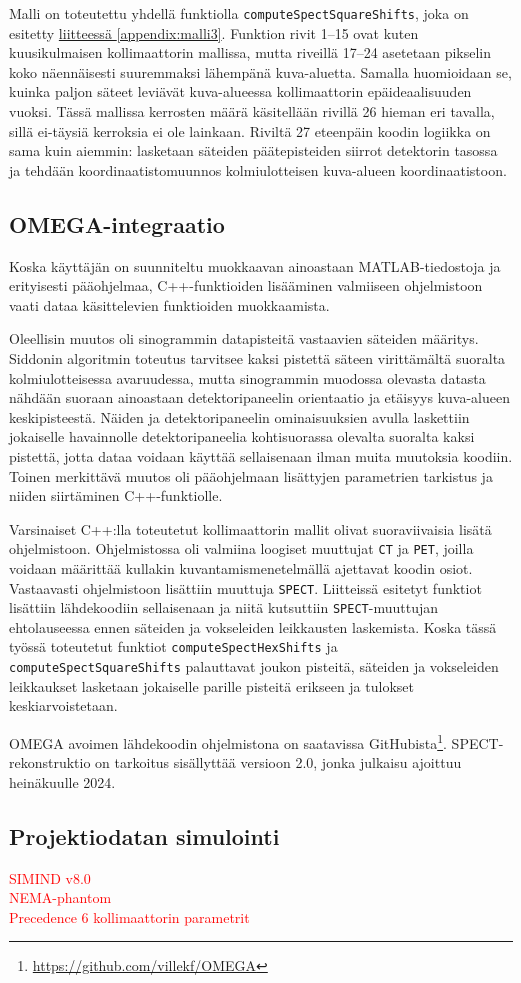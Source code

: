 Malli on toteutettu yhdellä funktiolla \texttt{computeSpectSquareShifts}, joka on esitetty \hyperref[appendix:malli3]{liitteessä \ref*{appendix:malli3}}. Funktion rivit 1--15 ovat kuten kuusikulmaisen kollimaattorin mallissa, mutta riveillä 17--24 asetetaan pikselin koko näennäisesti suuremmaksi lähempänä kuva-aluetta. Samalla huomioidaan se, kuinka paljon säteet leviävät kuva-alueessa kollimaattorin epäideaalisuuden vuoksi. Tässä mallissa kerrosten määrä käsitellään rivillä 26 hieman eri tavalla, sillä ei-täysiä kerroksia ei ole lainkaan. Riviltä 27 eteenpäin koodin logiikka on sama kuin aiemmin: lasketaan säteiden päätepisteiden siirrot detektorin tasossa ja tehdään koordinaatistomuunnos kolmiulotteisen kuva-alueen koordinaatistoon.

\subsection{OMEGA-integraatio}
Koska käyttäjän on suunniteltu muokkaavan ainoastaan MATLAB-tiedostoja ja erityisesti pääohjelmaa, C++-funktioiden lisääminen valmiiseen ohjelmistoon vaati dataa käsittelevien funktioiden muokkaamista.

Oleellisin muutos oli sinogrammin datapisteitä vastaavien säteiden määritys. Siddonin algoritmin toteutus tarvitsee kaksi pistettä säteen virittämältä suoralta kolmiulotteisessa avaruudessa, mutta sinogrammin muodossa olevasta datasta nähdään suoraan ainoastaan detektoripaneelin orientaatio ja etäisyys kuva-alueen keskipisteestä. Näiden ja detektoripaneelin ominaisuuksien avulla laskettiin jokaiselle havainnolle detektoripaneelia kohtisuorassa olevalta suoralta kaksi pistettä, jotta dataa voidaan käyttää sellaisenaan ilman muita muutoksia koodiin. Toinen merkittävä muutos oli pääohjelmaan lisättyjen parametrien tarkistus ja niiden siirtäminen C++-funktiolle.

Varsinaiset C++:lla toteutetut kollimaattorin mallit olivat suoraviivaisia lisätä ohjelmistoon. Ohjelmistossa oli valmiina loogiset muuttujat \texttt{CT} ja \texttt{PET}, joilla voidaan määrittää kullakin kuvantamismenetelmällä ajettavat koodin osiot. Vastaavasti ohjelmistoon lisättiin muuttuja \texttt{SPECT}. Liitteissä esitetyt funktiot lisättiin lähdekoodiin sellaisenaan ja niitä kutsuttiin \texttt{SPECT}-muuttujan ehtolauseessa ennen säteiden ja vokseleiden leikkausten laskemista. Koska tässä työssä toteutetut funktiot \texttt{computeSpectHexShifts} ja \texttt{computeSpectSquareShifts} palauttavat joukon pisteitä, säteiden ja vokseleiden leikkaukset lasketaan jokaiselle parille pisteitä erikseen ja tulokset keskiarvoistetaan.

OMEGA avoimen lähdekoodin ohjelmistona on saatavissa GitHubista\footnote{\url{https://github.com/villekf/OMEGA}}. SPECT-rekonstruktio on tarkoitus sisällyttää versioon 2.0, jonka julkaisu ajoittuu heinäkuulle 2024.

\subsection{Projektiodatan simulointi}
\textcolor{red}{
    SIMIND v8.0\\
    NEMA-phantom \\
    Precedence 6 kollimaattorin parametrit\cite{peters_towards_2019}
}